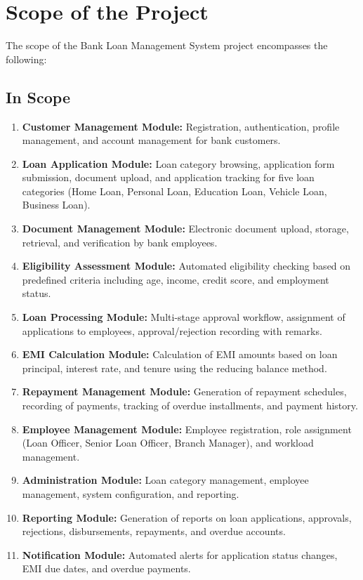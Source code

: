 \documentclass[12pt,a4paper,oneside]{report}
\begin{document}
\section{Scope of the Project}

The scope of the Bank Loan Management System project encompasses the following:

\subsection{In Scope}

\begin{enumerate}
  \item \textbf{Customer Management Module:} Registration, authentication, profile management, and account management for bank customers.
  \item \textbf{Loan Application Module:} Loan category browsing, application form submission, document upload, and application tracking for five loan categories (Home Loan, Personal Loan, Education Loan, Vehicle Loan, Business Loan).
  \item \textbf{Document Management Module:} Electronic document upload, storage, retrieval, and verification by bank employees.
  \item \textbf{Eligibility Assessment Module:} Automated eligibility checking based on predefined criteria including age, income, credit score, and employment status.
  \item \textbf{Loan Processing Module:} Multi-stage approval workflow, assignment of applications to employees, approval/rejection recording with remarks.
  \item \textbf{EMI Calculation Module:} Calculation of EMI amounts based on loan principal, interest rate, and tenure using the reducing balance method.
  \item \textbf{Repayment Management Module:} Generation of repayment schedules, recording of payments, tracking of overdue installments, and payment history.
  \item \textbf{Employee Management Module:} Employee registration, role assignment (Loan Officer, Senior Loan Officer, Branch Manager), and workload management.
  \item \textbf{Administration Module:} Loan category management, employee management, system configuration, and reporting.
  \item \textbf{Reporting Module:} Generation of reports on loan applications, approvals, rejections, disbursements, repayments, and overdue accounts.
  \item \textbf{Notification Module:} Automated alerts for application status changes, EMI due dates, and overdue payments.
\end{enumerate}
\end{document}
